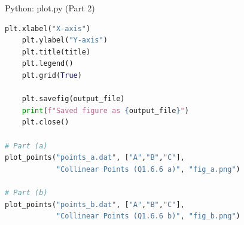 \documentclass{beamer}
\numberwithin{equation}{section}
\theoremstyle{remark}
\begin{document}
\begin{frame}[fragile]{Python: plot.py (Part 2)}
\begin{lstlisting}[language=Python]
    plt.xlabel("X-axis")
    plt.ylabel("Y-axis")
    plt.title(title)
    plt.legend()
    plt.grid(True)

    plt.savefig(output_file)
    print(f"Saved figure as {output_file}")
    plt.close()

# Part (a)
plot_points("points_a.dat", ["A","B","C"],
            "Collinear Points (Q1.6.6 a)", "fig_a.png")

# Part (b)
plot_points("points_b.dat", ["A","B","C"],
            "Collinear Points (Q1.6.6 b)", "fig_b.png")
\end{lstlisting}
\end{frame}
\end{document}
